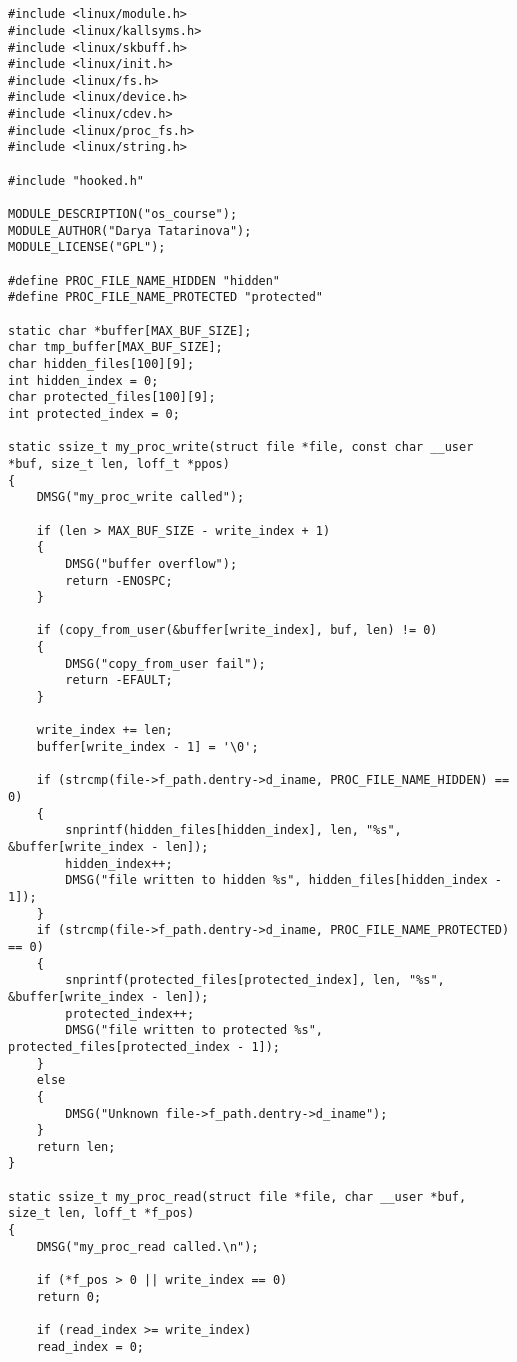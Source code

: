 \chapter{}

\begin{lstlisting}[label=code:main,caption=Файл main.c]
#include <linux/module.h>
#include <linux/kallsyms.h>
#include <linux/skbuff.h>
#include <linux/init.h>
#include <linux/fs.h>
#include <linux/device.h>
#include <linux/cdev.h>
#include <linux/proc_fs.h>
#include <linux/string.h>

#include "hooked.h"

MODULE_DESCRIPTION("os_course");
MODULE_AUTHOR("Darya Tatarinova");
MODULE_LICENSE("GPL");

#define PROC_FILE_NAME_HIDDEN "hidden"
#define PROC_FILE_NAME_PROTECTED "protected"

static char *buffer[MAX_BUF_SIZE];
char tmp_buffer[MAX_BUF_SIZE];
char hidden_files[100][9];
int hidden_index = 0;
char protected_files[100][9];
int protected_index = 0;

static ssize_t my_proc_write(struct file *file, const char __user *buf, size_t len, loff_t *ppos) 
{
	DMSG("my_proc_write called");
	
	if (len > MAX_BUF_SIZE - write_index + 1)
	{
		DMSG("buffer overflow");
		return -ENOSPC;
	}
	
	if (copy_from_user(&buffer[write_index], buf, len) != 0)
	{
		DMSG("copy_from_user fail");
		return -EFAULT;
	}
	
	write_index += len;
	buffer[write_index - 1] = '\0';
	
	if (strcmp(file->f_path.dentry->d_iname, PROC_FILE_NAME_HIDDEN) == 0)
	{
		snprintf(hidden_files[hidden_index], len, "%s", &buffer[write_index - len]);
		hidden_index++;
		DMSG("file written to hidden %s", hidden_files[hidden_index - 1]);
	}
	if (strcmp(file->f_path.dentry->d_iname, PROC_FILE_NAME_PROTECTED) == 0)
	{
		snprintf(protected_files[protected_index], len, "%s", &buffer[write_index - len]);
		protected_index++;
		DMSG("file written to protected %s", protected_files[protected_index - 1]);
	}
	else
	{
		DMSG("Unknown file->f_path.dentry->d_iname");
	}
	return len;
}

static ssize_t my_proc_read(struct file *file, char __user *buf, size_t len, loff_t *f_pos) 
{
	DMSG("my_proc_read called.\n");
	
	if (*f_pos > 0 || write_index == 0)
	return 0;
	
	if (read_index >= write_index)
	read_index = 0;
	

\end{lstlisting}
